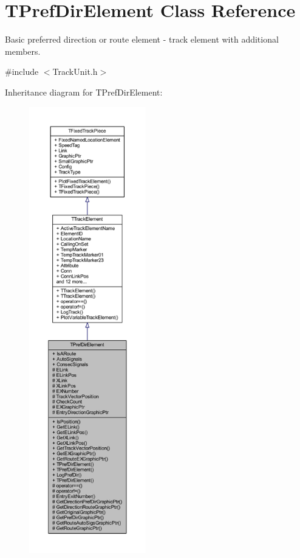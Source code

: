 \hypertarget{class_t_pref_dir_element}{}\section{T\+Pref\+Dir\+Element Class Reference}
\label{class_t_pref_dir_element}


Basic preferred direction or route element -\/ track element with additional members.  




{\ttfamily \#include $<$Track\+Unit.\+h$>$}



Inheritance diagram for T\+Pref\+Dir\+Element\+:\nopagebreak
\begin{figure}[H]
\begin{center}
\leavevmode
\includegraphics[height=550pt]{class_t_pref_dir_element__inherit__graph}
\end{center}
\end{figure}


